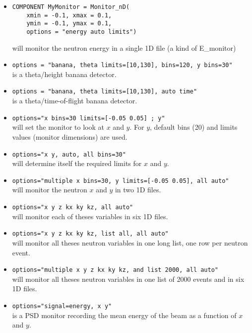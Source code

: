 \begin{itemize}
\item{
\begin{lstlisting}
COMPONENT MyMonitor = Monitor_nD(
    xmin = -0.1, xmax = 0.1,
    ymin = -0.1, ymax = 0.1,
    options = "energy auto limits")
\end{lstlisting}
will monitor the neutron energy in a single 1D file (a kind of E\_monitor)}
\item{\texttt{options = "banana, theta limits=[10,130], bins=120, y bins=30"} \\
    is a theta/height banana detector.}
\item{\texttt{options = "banana, theta limits=[10,130], auto time"} \\
    is a theta/time-of-flight banana detector.}

\item{\texttt{options="x bins=30 limits=[-0.05 0.05] ; y"} \\
    will set the monitor to look at $x$ and $y$. For $y$, default bins (20)
    and limits values (monitor dimensions) are used.}

\item{\texttt{options="x y, auto, all bins=30"} \\
    will determine itself the required limits for $x$ and $y$.}

\item{\texttt{options="multiple x bins=30, y limits=[-0.05 0.05], all auto"} \\
will monitor the neutron $x$ and $y$ in two 1D files.}
\item{\texttt{options="x y z kx ky kz, all auto"} \\
will monitor each of theses variables in six 1D files.}
\item{\texttt{options="x y z kx ky kz, list all, all auto"} \\
will monitor all theses neutron variables in one long list, one row per neutron event.}
\item{\texttt{options="multiple x y z kx ky kz, and list 2000, all auto"} \\
    will monitor all theses neutron variables in one list of 2000 events
    and in six 1D files.}
\item{\texttt{options="signal=energy, x y"} \\
    is a PSD monitor recording the mean energy of the beam as a function of $x$ and $y$.}
\end{itemize}

